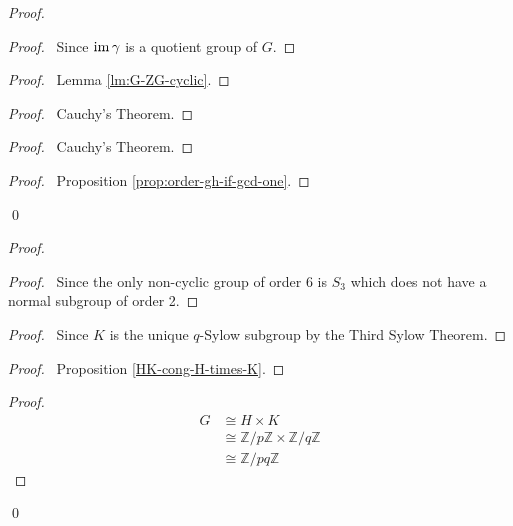 \begin{proof}
\pf
{}
\begin{proof}
	\pf\ Since $\operatorname{im} \gamma$ is a quotient group of $G$.
\end{proof}
\begin{proof}
	\pf\ Lemma \ref{lm:G-ZG-cyclic}.
\end{proof}
\begin{proof}
	\pf\ Cauchy's Theorem.
\end{proof}
\begin{proof}
	\pf\ Cauchy's Theorem.
\end{proof}
\begin{proof}
	\pf\ Proposition \ref{prop:order-gh-if-gcd-one}.
\end{proof}
\qed
\end{proof}

\begin{proof}
\pf
{}
\begin{proof}
	\pf\ Since the only non-cyclic group of order 6 is $S_3$ which does not have a normal subgroup of order 2.
\end{proof}
\begin{proof}
	\pf\ Since $K$ is the unique $q$-Sylow subgroup by the Third Sylow Theorem.
\end{proof}
\begin{proof}
	\pf\ Proposition \ref{HK-cong-H-times-K}.
\end{proof}
\begin{proof}
	\pf
	\begin{align*}
		G & \cong H \times K \\
		& \cong \mathbb{Z} / p \mathbb{Z} \times \mathbb{Z} / q \mathbb{Z} \\
		& \cong \mathbb{Z} / pq \mathbb{Z}
	\end{align*}
\end{proof}
\qed
\end{proof}

